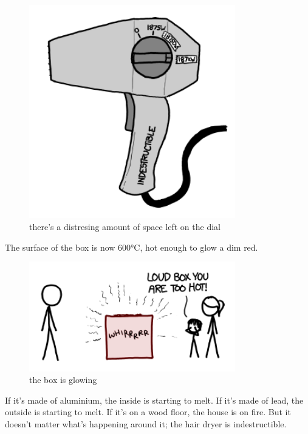 \begin{figure}[!htbp]
\centering
\includegraphics[scale=0.5, max width=0.8\textwidth]{imgs/a/35/hair_dryer_187500.png}
\caption{there's a distresing amount of space left on the dial}
\end{figure}

{The surface of the box is now 600°C, hot enough to glow a dim red.}

\begin{figure}[!htbp]
\centering
\includegraphics[scale=0.5, max width=0.8\textwidth]{imgs/a/35/hair_dryer_box600.png}
\caption{the box is glowing}
\end{figure}

{If it’s made of aluminium, the inside is starting to melt. If it’s made of lead, the outside is starting to melt. If it’s on a wood floor, the house is on fire. But it doesn't matter what's happening around it; the hair dryer is indestructible.}

